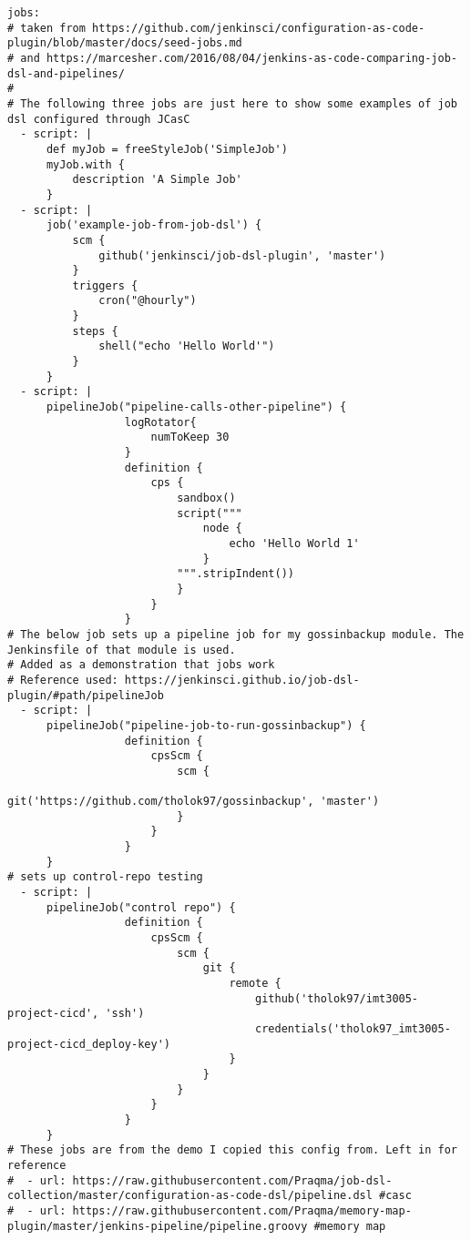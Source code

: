 \begin{verbatim}
jobs:
# taken from https://github.com/jenkinsci/configuration-as-code-plugin/blob/master/docs/seed-jobs.md
# and https://marcesher.com/2016/08/04/jenkins-as-code-comparing-job-dsl-and-pipelines/
#
# The following three jobs are just here to show some examples of job dsl configured through JCasC
  - script: |
      def myJob = freeStyleJob('SimpleJob')
      myJob.with {
          description 'A Simple Job'
      }
  - script: |
      job('example-job-from-job-dsl') {
          scm {
              github('jenkinsci/job-dsl-plugin', 'master')
          }
          triggers {
              cron("@hourly")
          }
          steps {
              shell("echo 'Hello World'")
          }
      }
  - script: |
      pipelineJob("pipeline-calls-other-pipeline") {
                  logRotator{
                      numToKeep 30
                  }
                  definition {
                      cps {
                          sandbox()
                          script("""
                              node {
                                  echo 'Hello World 1'
                              }
                          """.stripIndent())
                          }
                      }
                  }
# The below job sets up a pipeline job for my gossinbackup module. The Jenkinsfile of that module is used.
# Added as a demonstration that jobs work
# Reference used: https://jenkinsci.github.io/job-dsl-plugin/#path/pipelineJob
  - script: |
      pipelineJob("pipeline-job-to-run-gossinbackup") {
                  definition {
                      cpsScm {
                          scm {
                              git('https://github.com/tholok97/gossinbackup', 'master')
                          }
                      }
                  }
      }
# sets up control-repo testing
  - script: |
      pipelineJob("control repo") {
                  definition {
                      cpsScm {
                          scm {
                              git {
                                  remote {
                                      github('tholok97/imt3005-project-cicd', 'ssh')
                                      credentials('tholok97_imt3005-project-cicd_deploy-key')
                                  }
                              }
                          }
                      }
                  }
      }
# These jobs are from the demo I copied this config from. Left in for reference
#  - url: https://raw.githubusercontent.com/Praqma/job-dsl-collection/master/configuration-as-code-dsl/pipeline.dsl #casc
#  - url: https://raw.githubusercontent.com/Praqma/memory-map-plugin/master/jenkins-pipeline/pipeline.groovy #memory map

\end{verbatim}
